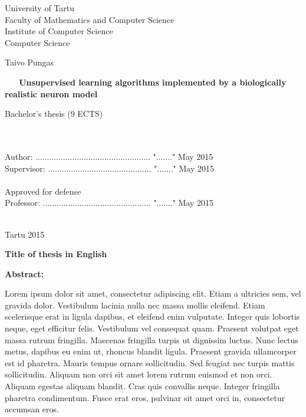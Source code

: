 \documentclass[a4paper,12pt]{report}
\theoremstyle{definition}
\begin{document}
\begin{center}
	{\Large
	University of Tartu\\
	Faculty of Mathematics and Computer Science\\
	Institute of Computer Science\\
	Computer Science\\}
	
	\vspace{2.5cm}
	
	{\LARGE Taivo Pungas}\\
	\vspace{0.5cm}
	\begin{spacing}{2}{\Huge\bf \ \ \ Unsupervised learning algorithms implemented by a biologically realistic neuron model}\end{spacing}
	\vspace{0.5cm}
	{\LARGE Bachelor's thesis (9 ECTS)}
\end{center}
\vspace{3cm}
\hspace{7.2cm}{\Large Supervisors: Dr. Raul Vicente\\}
\vspace{-0.5cm}

\hspace{10.4cm}{\Large Dr. Jaan Aru \\}

\ \\
\ \\
Author: .................................................. "......." May 2015\\
Supervisor: ............................................. "......." May 2015\\
\ \\
Approved for defense\\
Professor: ............................................... "......." May 2015\\
\ \\
\begin{center}
	{\Large Tartu 2015}
\end{center}
\thispagestyle{empty}
\pagebreak




{\textbf
{\Large Title of thesis in English}}

\textbf{Abstract:}

Lorem ipsum dolor sit amet, consectetur adipiscing elit. Etiam a ultricies sem, vel gravida dolor. Vestibulum lacinia nulla nec massa mollis eleifend. Etiam scelerisque erat in ligula dapibus, et eleifend enim vulputate. Integer quis lobortis neque, eget efficitur felis. Vestibulum vel consequat quam. Praesent volutpat eget massa rutrum fringilla. Maecenas fringilla turpis ut dignissim luctus. Nunc lectus metus, dapibus eu enim ut, rhoncus blandit ligula. Praesent gravida ullamcorper est id pharetra. Mauris tempus ornare sollicitudin. Sed feugiat nec turpis mattis sollicitudin. Aliquam non orci sit amet lorem rutrum euismod et non orci. Aliquam egestas aliquam blandit. Cras quis convallis neque. Integer fringilla pharetra condimentum. Fusce erat eros, pulvinar sit amet orci in, consectetur accumsan eros.
\end{document}
